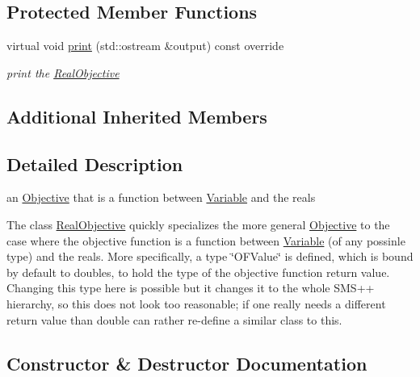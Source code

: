 \subsection*{Protected Member Functions}
\begin{DoxyCompactItemize}
\item 
\mbox{\label{class_s_m_spp__di__unipi__it_1_1_real_objective_a59a9fcbf8f9f86d348344b2073644b0e}} 
virtual void \mbox{\hyperlink{class_s_m_spp__di__unipi__it_1_1_real_objective_a59a9fcbf8f9f86d348344b2073644b0e}{print}} (std\+::ostream \&output) const override
\begin{DoxyCompactList}\small\item\em print the \mbox{\hyperlink{class_s_m_spp__di__unipi__it_1_1_real_objective}{Real\+Objective}} \end{DoxyCompactList}\end{DoxyCompactItemize}
\subsection*{Additional Inherited Members}


\subsection{Detailed Description}
an \mbox{\hyperlink{class_s_m_spp__di__unipi__it_1_1_objective}{Objective}} that is a function between \mbox{\hyperlink{class_s_m_spp__di__unipi__it_1_1_variable}{Variable}} and the reals 

The class \mbox{\hyperlink{class_s_m_spp__di__unipi__it_1_1_real_objective}{Real\+Objective}} quickly specializes the more general \mbox{\hyperlink{class_s_m_spp__di__unipi__it_1_1_objective}{Objective}} to the case where the objective function is a function between \mbox{\hyperlink{class_s_m_spp__di__unipi__it_1_1_variable}{Variable}} (of any possinle type) and the reals. More specifically, a type \char`\"{}\+O\+F\+Value\char`\"{} is defined, which is bound by default to doubles, to hold the type of the objective function return value. Changing this type here is possible but it changes it to the whole S\+M\+S++ hierarchy, so this does not look too reasonable; if one really needs a different return value than double can rather re-\/define a similar class to this. 

\subsection{Constructor \& Destructor Documentation}
\mbox{\label{class_s_m_spp__di__unipi__it_1_1_real_objective_a48781de868c0394b5b83fd7f21f0405b}} 
